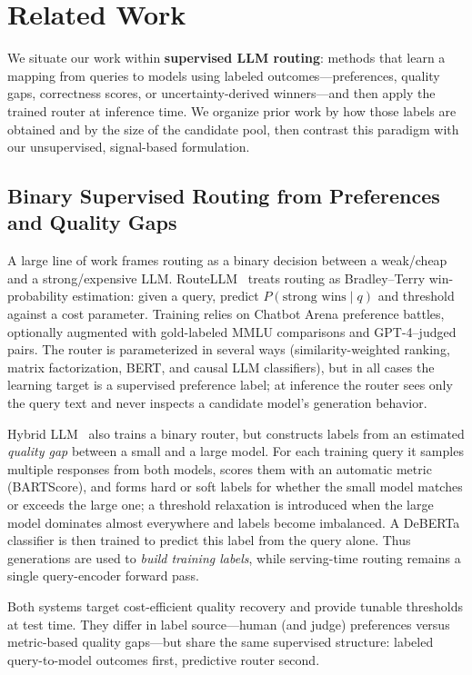 \section{Related Work}
\label{sec:related}

We situate our work within \textbf{supervised LLM routing}: methods that learn a mapping from queries to models using labeled outcomes---preferences, quality gaps, correctness scores, or uncertainty-derived winners---and then apply the trained router at inference time.
We organize prior work by how those labels are obtained and by the size of the candidate pool, then contrast this paradigm with our unsupervised, signal-based formulation.

\subsection{Binary Supervised Routing from Preferences and Quality Gaps}

A large line of work frames routing as a binary decision between a weak/cheap and a strong/expensive LLM.
RouteLLM~\cite{ong2025routellm} treats routing as Bradley--Terry win-probability estimation: given a query, predict $P(\text{strong wins}\mid q)$ and threshold against a cost parameter.
Training relies on Chatbot Arena preference battles, optionally augmented with gold-labeled MMLU comparisons and GPT-4--judged pairs.
The router is parameterized in several ways (similarity-weighted ranking, matrix factorization, BERT, and causal LLM classifiers), but in all cases the learning target is a supervised preference label; at inference the router sees only the query text and never inspects a candidate model's generation behavior.

Hybrid LLM~\cite{ding2024hybrid} also trains a binary router, but constructs labels from an estimated \emph{quality gap} between a small and a large model.
For each training query it samples multiple responses from both models, scores them with an automatic metric (BARTScore), and forms hard or soft labels for whether the small model matches or exceeds the large one; a threshold relaxation is introduced when the large model dominates almost everywhere and labels become imbalanced.
A DeBERTa classifier is then trained to predict this label from the query alone.
Thus generations are used to \emph{build training labels}, while serving-time routing remains a single query-encoder forward pass.

Both systems target cost-efficient quality recovery and provide tunable thresholds at test time.
They differ in label source---human (and judge) preferences versus metric-based quality gaps---but share the same supervised structure: labeled query-to-model outcomes first, predictive router second.

